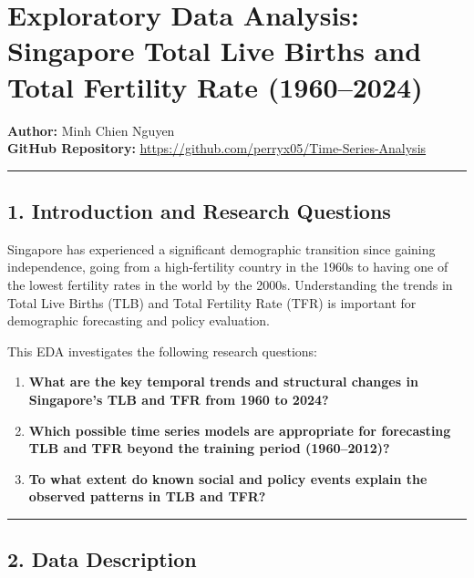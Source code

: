 \documentclass[
]{article}
\author{}
\date{}
\providecommand{\tightlist}{%
  \setlength{\itemsep}{0pt}\setlength{\parskip}{0pt}}
\begin{document}
\section{Exploratory Data Analysis: Singapore Total Live Births and
Total Fertility Rate
(1960--2024)}\label{exploratory-data-analysis-singapore-total-live-births-and-total-fertility-rate-19602024}

\textbf{Author:} Minh Chien Nguyen\\
\textbf{GitHub Repository:}
\url{https://github.com/perryx05/Time-Series-Analysis}

\begin{center}\rule{0.5\linewidth}{0.5pt}\end{center}

\subsection{1. Introduction and Research
Questions}\label{introduction-and-research-questions}

Singapore has experienced a significant demographic transition since
gaining independence, going from a high-fertility country in the 1960s
to having one of the lowest fertility rates in the world by the 2000s.
Understanding the trends in Total Live Births (TLB) and Total Fertility
Rate (TFR) is important for demographic forecasting and policy
evaluation.

This EDA investigates the following research questions:

\begin{enumerate}
\def\labelenumi{\arabic{enumi}.}
\tightlist
\item
  \textbf{What are the key temporal trends and structural changes in
  Singapore's TLB and TFR from 1960 to 2024?}
\item
  \textbf{Which possible time series models are appropriate for
  forecasting TLB and TFR beyond the training period (1960--2012)?}
\item
  \textbf{To what extent do known social and policy events explain the
  observed patterns in TLB and TFR?}
\end{enumerate}

\begin{center}\rule{0.5\linewidth}{0.5pt}\end{center}

\subsection{2. Data Description}\label{data-description}
\end{document}
